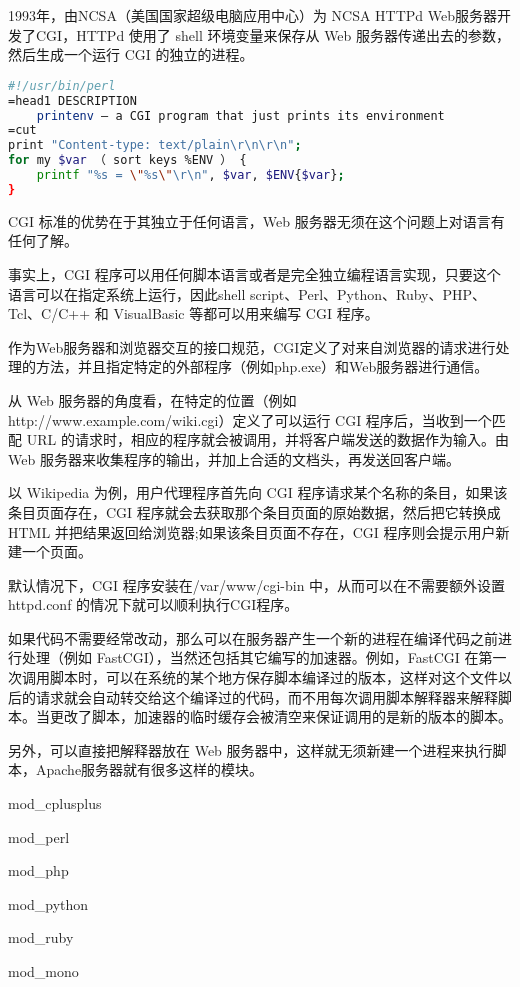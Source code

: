 1993年，由NCSA（美国国家超级电脑应用中心）为 NCSA HTTPd Web服务器开发了CGI，HTTPd 使用了 shell 环境变量来保存从 Web 服务器传递出去的参数，然后生成一个运行 CGI 的独立的进程。

\begin{lstlisting}[language=bash]
#!/usr/bin/perl
=head1 DESCRIPTION
	printenv — a CGI program that just prints its environment
=cut
print "Content-type: text/plain\r\n\r\n";
for my $var （ sort keys %ENV ） {
	printf "%s = \"%s\"\r\n", $var, $ENV{$var};
}
\end{lstlisting}

CGI 标准的优势在于其独立于任何语言，Web 服务器无须在这个问题上对语言有任何了解。

事实上，CGI 程序可以用任何脚本语言或者是完全独立编程语言实现，只要这个语言可以在指定系统上运行，因此shell script、Perl、Python、Ruby、PHP、Tcl、C/C++ 和 VisualBasic 等都可以用来编写 CGI 程序。

作为Web服务器和浏览器交互的接口规范，CGI定义了对来自浏览器的请求进行处理的方法，并且指定特定的外部程序（例如php.exe）和Web服务器进行通信。

从 Web 服务器的角度看，在特定的位置（例如 http://www.example.com/wiki.cgi）定义了可以运行 CGI 程序后，当收到一个匹配 URL 的请求时，相应的程序就会被调用，并将客户端发送的数据作为输入。由 Web 服务器来收集程序的输出，并加上合适的文档头，再发送回客户端。

以 Wikipedia 为例，用户代理程序首先向 CGI 程序请求某个名称的条目，如果该条目页面存在，CGI 程序就会去获取那个条目页面的原始数据，然后把它转换成 HTML 并把结果返回给浏览器;如果该条目页面不存在，CGI 程序则会提示用户新建一个页面。





默认情况下，CGI 程序安装在/var/www/cgi-bin 中，从而可以在不需要额外设置httpd.conf 的情况下就可以顺利执行CGI程序。

如果代码不需要经常改动，那么可以在服务器产生一个新的进程在编译代码之前进行处理（例如 FastCGI），当然还包括其它编写的加速器。例如，FastCGI 在第一次调用脚本时，可以在系统的某个地方保存脚本编译过的版本，这样对这个文件以后的请求就会自动转交给这个编译过的代码，而不用每次调用脚本解释器来解释脚本。当更改了脚本，加速器的临时缓存会被清空来保证调用的是新的版本的脚本。

另外，可以直接把解释器放在 Web 服务器中，这样就无须新建一个进程来执行脚本，Apache服务器就有很多这样的模块。

\begin{compactitem}
\item mod\_cplusplus
\item mod\_perl
\item mod\_php
\item mod\_python
\item mod\_ruby
\item mod\_mono
\end{compactitem}

